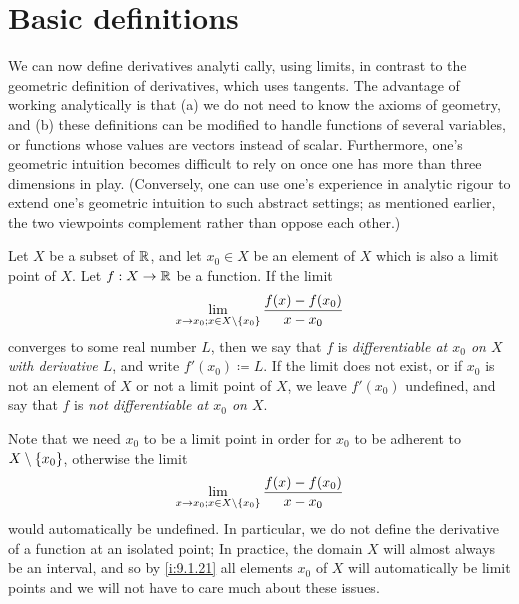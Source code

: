 \section{Basic definitions}\label{i:sec:10.1}

\begin{note}
  We can now define derivatives analyti cally, using limits, in contrast to the geometric definition of derivatives, which uses tangents.
  The advantage of working analytically is that
  (a) we do not need to know the axioms of geometry, and
  (b) these definitions can be modified to handle functions of several variables, or functions whose values are vectors instead of scalar.
  Furthermore, one's geometric intuition becomes difficult to rely on once one has more than three dimensions in play.
  (Conversely, one can use one's experience in analytic rigour to extend one's geometric intuition to such abstract settings;
  as mentioned earlier, the two viewpoints complement rather than oppose each other.)
\end{note}

\begin{defn}\label{i:10.1.1}
  Let \(X\) be a subset of \(\mathbb{R}\), and let \(x_0 \in X\) be an element of \(X\) which is also a limit point of \(X\).
  Let \(f : X \to \mathbb{R}\) be a function.
  If the limit
  \[
    \lim_{x \to x_0 ; x \in X \setminus \left\lbrace x_0\right\rbrace} \dfrac{f(x) - f(x_0)}{x - x_0}
  \]
  converges to some real number \(L\), then we say that \(f\) is \emph{differentiable at \(x_0\) on \(X\) with derivative \(L\)}, and write \(f'(x_0) \coloneqq L\).
  If the limit does not exist, or if \(x_0\) is not an element of \(X\) or not a limit point of \(X\), we leave \(f'(x_0)\) undefined, and say that \(f\) is \emph{not differentiable at \(x_0\) on \(X\)}.
\end{defn}

\begin{rmk}\label{i:10.1.2}
  Note that we need \(x_0\) to be a limit point in order for \(x_0\) to be adherent to \(X \setminus \left\lbrace x_0\right\rbrace\), otherwise the limit
  \[
    \lim_{x \to x_0 ; x \in X \setminus \left\lbrace x_0\right\rbrace} \dfrac{f(x) - f(x_0)}{x - x_0}
  \]
  would automatically be undefined.
  In particular, we do not define the derivative of a function at an isolated point;
  In practice, the domain \(X\) will almost always be an interval, and so by \cref{i:9.1.21} all elements \(x_0\) of \(X\) will automatically be limit points and we will not have to care much about these issues.
\end{rmk}

